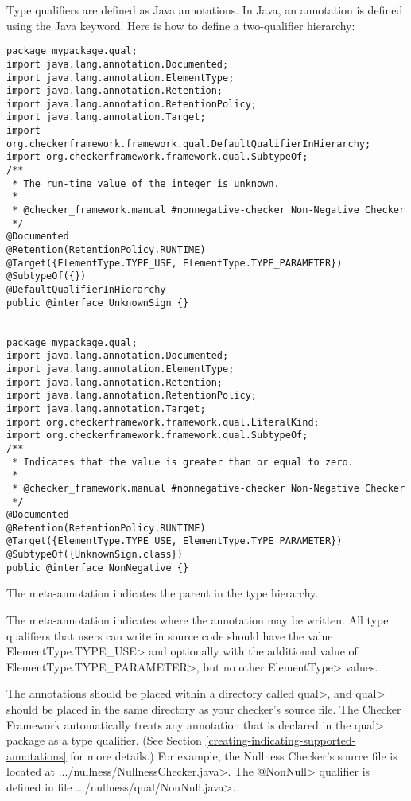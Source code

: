 Type qualifiers are defined as Java annotations.  In Java, an
annotation is defined using the Java  keyword.
Here is how to define a two-qualifier hierarchy:

\begin{Verbatim}
package mypackage.qual;
import java.lang.annotation.Documented;
import java.lang.annotation.ElementType;
import java.lang.annotation.Retention;
import java.lang.annotation.RetentionPolicy;
import java.lang.annotation.Target;
import org.checkerframework.framework.qual.DefaultQualifierInHierarchy;
import org.checkerframework.framework.qual.SubtypeOf;
/**
 * The run-time value of the integer is unknown.
 *
 * @checker_framework.manual #nonnegative-checker Non-Negative Checker
 */
@Documented
@Retention(RetentionPolicy.RUNTIME)
@Target({ElementType.TYPE_USE, ElementType.TYPE_PARAMETER})
@SubtypeOf({})
@DefaultQualifierInHierarchy
public @interface UnknownSign {}


package mypackage.qual;
import java.lang.annotation.Documented;
import java.lang.annotation.ElementType;
import java.lang.annotation.Retention;
import java.lang.annotation.RetentionPolicy;
import java.lang.annotation.Target;
import org.checkerframework.framework.qual.LiteralKind;
import org.checkerframework.framework.qual.SubtypeOf;
/**
 * Indicates that the value is greater than or equal to zero.
 *
 * @checker_framework.manual #nonnegative-checker Non-Negative Checker
 */
@Documented
@Retention(RetentionPolicy.RUNTIME)
@Target({ElementType.TYPE_USE, ElementType.TYPE_PARAMETER})
@SubtypeOf({UnknownSign.class})
public @interface NonNegative {}
\end{Verbatim}

The  meta-annotation
indicates the parent in the type hierarchy.

The 
meta-annotation indicates where the annotation
may be written. All type qualifiers that users can write in source code should
have the value \<ElementType.TYPE\_USE> and optionally with the additional value
of \<ElementType.TYPE\_PARAMETER>, but no other \<ElementType> values.

The annotations should be placed within a directory called \<qual>, and
\<qual> should be placed in the same directory as your checker's source file.
The Checker Framework automatically treats any annotation that
is declared in the \<qual> package as a type qualifier.
(See Section \ref{creating-indicating-supported-annotations} for more details.)
For example, the Nullness Checker's source file is located at
\<.../nullness/NullnessChecker.java>. The \<@NonNull> qualifier is defined in
file \<.../nullness/qual/NonNull.java>.


